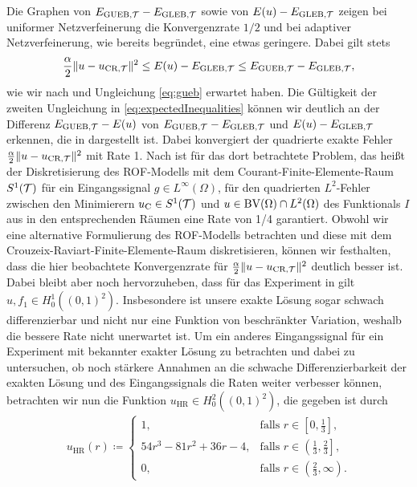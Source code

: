 Die Graphen von $E_{\textup{GUEB}, \mathcal{T}}-E_{\textup{GLEB}, \mathcal{T}}$ sowie von $E(u)-E_{\textup{GLEB}, \mathcal{T}}$ zeigen bei uniformer
Netzverfeinerung die Konvergenzrate $1/2$ und bei adaptiver Netzverfeinerung, wie
bereits begründet, eine etwas geringere.
Dabei gilt stets
\begin{align}
  \label{eq:expectedInequalities}
  \frac{\alpha}{2}\Vert u -u_{\textup{CR}, \mathcal{T}}\Vert^2
  \leq
  E(u)-E_{\textup{GLEB}, \mathcal{T}}
  \leq
  E_{\textup{GUEB}, \mathcal{T}}-E_{\textup{GLEB}, \mathcal{T}},
\end{align}
wie wir nach  und Ungleichung \ref{eq:gueb} erwartet haben.
Die Gültigkeit der zweiten Ungleichung in \eqref{eq:expectedInequalities}
können wir deutlich an der Differenz $E_{\textup{GUEB}, \mathcal{T}}-E(u)$ von $E_{\textup{GUEB}, \mathcal{T}}-E_{\textup{GLEB}, \mathcal{T}}$ und
$E(u)-E_{\textup{GLEB}, \mathcal{T}}$ erkennen, die in  dargestellt ist.
Dabei konvergiert der quadrierte exakte Fehler $\frac{\alpha}{2}\Vert
u-u_{\textup{CR}, \mathcal{T}}\Vert^2$ mit Rate 1.
Nach \cite[S. 309, Theorem 10.7]{Bar15} ist für das dort betrachtete Problem,
das heißt der Diskretisierung des ROF-Modells mit dem
Courant-Finite-Elemente-Raum $S^1(\mathcal{T})$ für ein Eingangssignal $g\in
L^\infty(\Omega)$, für den quadrierten $L^2$-Fehler zwischen den Minimierern
$u_{\textup{C}}\in S^1(\mathcal{T})$ und $u\in\textup{BV}(\Omega)\cap L^2(\Omega)$ des Funktionals $I$
aus  in den entsprechenden Räumen eine Rate von 1/4
garantiert.
Obwohl wir eine alternative Formulierung des ROF-Modells betrachten und diese
mit dem Crouzeix-Raviart-Finite-Elemente-Raum diskretisieren, können wir
festhalten, dass die hier beobachtete Konvergenzrate für $\frac{\alpha}{2}\Vert
u-u_{\textup{CR}, \mathcal{T}}\Vert^2$ deutlich besser ist.
Dabei bleibt aber noch hervorzuheben, dass für das Experiment in
 gilt $u,f_1\in H^1_0\left( (0,1)^2 \right)$. 
Insbesondere ist unsere exakte Lösung sogar schwach differenzierbar und nicht
nur eine Funktion von beschränkter Variation, weshalb die bessere Rate 
nicht unerwartet ist.
Um ein anderes Eingangssignal für ein Experiment mit bekannter exakter Lösung
zu betrachten und dabei zu untersuchen, ob noch stärkere Annahmen an die
schwache Differenzierbarkeit der exakten Lösung und des Eingangssignals die
Raten weiter verbesser können, betrachten wir nun die Funktion
$u_\textrm{HR} \in H^2_0\left((0,1)^2\right)$, die gegeben ist durch 
\begin{align*}
  u_\textrm{HR}(r)\coloneqq 
  \begin{cases}
    1, 
    & \text{falls } r\in\left[0, \frac{1}{3}\right]\!,\\
    54r^3 - 81r^2 + 36r - 4, 
    & \text{falls } r\in\left(\frac{1}{3}, \frac{2}{3}\right]\!,\\
    0, 
    & \text{falls } r\in\left(\frac{2}{3}, \infty\right)\!.
  \end{cases}
\end{align*}
